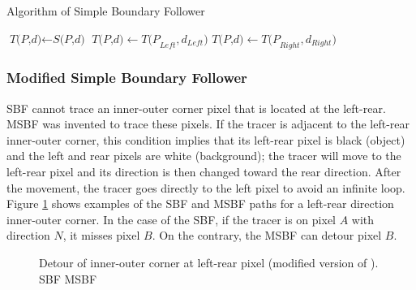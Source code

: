 \begin{algorithm}
	\caption{Algorithm of Simple Boundary Follower}\label{alg:sbf}
	\begin{algorithmic}[1]
	\State $\textit{T(P,d)} \gets \textit{S(P,d)}$
	\Do
	\State $\textit{T(P,d)} \gets \textit{T(P}_{Left},\textit{d}_{Left} )  $
	\Else
	\State $\textit{T(P,d)} \gets \textit{T(P}_{Right},\textit{d}_{Right})$
	\EndIf
	\EndProcedure
	\end{algorithmic}
\end{algorithm}

\subsubsection{Modified Simple Boundary Follower}

SBF cannot trace an inner-outer corner pixel that is located at the left-rear. MSBF \cite{Gose1996Pattern} was invented to trace these pixels. If the tracer is adjacent to the left-rear inner-outer corner, this condition implies that its left-rear pixel is black (object) and the left and rear pixels are white (background); the tracer will move to the left-rear pixel and its direction is then changed toward the rear direction. After the movement, the tracer goes directly to the left pixel to avoid an infinite loop. Figure \ref{fig:image3} shows examples of the SBF and MSBF paths for a left-rear direction inner-outer corner. In the case of the SBF, if the tracer is on pixel $A$ with direction $N$, it misses pixel $B$. On the contrary, the MSBF can detour pixel $B$.

\begin{figure}[htbp]
	\centering
	 
	\caption{Detour of inner-outer corner at left-rear pixel (modified version of \cite{Gose1996Pattern}). \protect{} SBF \protect{} MSBF}
	\label{fig:image3}
\end{figure}


